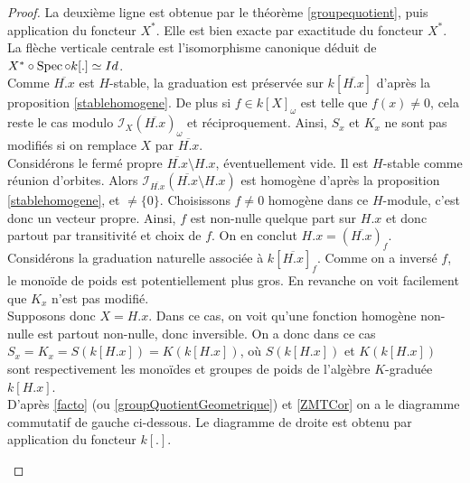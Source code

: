 \begin{proof}
La deuxième ligne est obtenue par le théorème \ref{groupequotient}, puis application du foncteur $X^*$. Elle est bien exacte par exactitude du foncteur $X^*$. La flèche verticale centrale est l'isomorphisme canonique déduit de $X^*\circ\operatorname{Spec}\circ k[.]\simeq Id$.\\ 
Comme $\overline{H.x}$ est $H$-stable, la graduation est préservée sur $k[\overline{H.x}]$ d'après la proposition \ref{stablehomogene}. De plus si $f\in k[X]_{\omega}$ est telle que $f(x)\neq 0$, cela reste le cas modulo $\mathcal{I}_{X}(\overline{H.x})_\omega$ et réciproquement. Ainsi, $S_x$ et $K_x$ ne sont pas modifiés si on remplace $X$ par $\overline{H.x}$. \\
Considérons le fermé propre $\overline{H.x}\setminus H.x$, éventuellement vide. Il est $H$-stable comme réunion d'orbites. Alors $\mathcal{I}_{\overline{H.x}}(\overline{H.x}\setminus H.x)$ est homogène d'après la proposition \ref{stablehomogene}, et $\neq \lbrace 0\rbrace$. Choisissons $f\neq0$ homogène dans ce $H$-module, c'est donc un vecteur propre. Ainsi, $f$ est non-nulle quelque part sur $H.x$ et donc partout par transitivité et choix de $f$. On en conclut $H.x=(\overline{H.x})_f$. Considérons la graduation naturelle associée à $k[\overline{H.x}]_f$. Comme on a inversé $f$, le monoïde de poids est potentiellement plus gros. En revanche on voit facilement que $K_x$ n'est pas modifié.\\
Supposons donc $X=H.x$. Dans ce cas, on voit qu'une fonction homogène non-nulle est partout non-nulle, donc inversible. On a donc dans ce cas $S_x=K_x=S(k[H.x])=K(k[H.x])$, où $S(k[H.x])$ et $K(k[H.x])$ sont respectivement les monoïdes et groupes de poids de l'algèbre $K$-graduée $k[H.x]$. \\
D'après \ref{facto} (ou \ref{groupQuotientGeometrique}) et \ref{ZMTCor} on a le diagramme commutatif de gauche ci-dessous. Le diagramme de droite est obtenu par application du foncteur $k[.]$.
\begin{multicols}{2}
	\begin{center}
	\end{center}


\end{multicols}
\end{proof}
